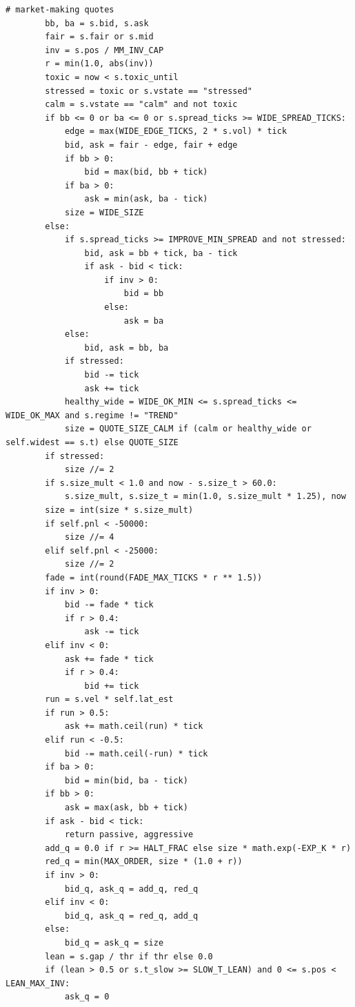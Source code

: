\begin{lstlisting}[style=algocode]
        # market-making quotes
        bb, ba = s.bid, s.ask
        fair = s.fair or s.mid
        inv = s.pos / MM_INV_CAP
        r = min(1.0, abs(inv))
        toxic = now < s.toxic_until
        stressed = toxic or s.vstate == "stressed"
        calm = s.vstate == "calm" and not toxic
        if bb <= 0 or ba <= 0 or s.spread_ticks >= WIDE_SPREAD_TICKS:
            edge = max(WIDE_EDGE_TICKS, 2 * s.vol) * tick
            bid, ask = fair - edge, fair + edge
            if bb > 0:
                bid = max(bid, bb + tick)
            if ba > 0:
                ask = min(ask, ba - tick)
            size = WIDE_SIZE
        else:
            if s.spread_ticks >= IMPROVE_MIN_SPREAD and not stressed:
                bid, ask = bb + tick, ba - tick
                if ask - bid < tick:
                    if inv > 0:
                        bid = bb
                    else:
                        ask = ba
            else:
                bid, ask = bb, ba
            if stressed:
                bid -= tick
                ask += tick
            healthy_wide = WIDE_OK_MIN <= s.spread_ticks <= WIDE_OK_MAX and s.regime != "TREND"
            size = QUOTE_SIZE_CALM if (calm or healthy_wide or self.widest == s.t) else QUOTE_SIZE
        if stressed:
            size //= 2
        if s.size_mult < 1.0 and now - s.size_t > 60.0:
            s.size_mult, s.size_t = min(1.0, s.size_mult * 1.25), now
        size = int(size * s.size_mult)
        if self.pnl < -50000:
            size //= 4
        elif self.pnl < -25000:
            size //= 2
        fade = int(round(FADE_MAX_TICKS * r ** 1.5))
        if inv > 0:
            bid -= fade * tick
            if r > 0.4:
                ask -= tick
        elif inv < 0:
            ask += fade * tick
            if r > 0.4:
                bid += tick
        run = s.vel * self.lat_est
        if run > 0.5:
            ask += math.ceil(run) * tick
        elif run < -0.5:
            bid -= math.ceil(-run) * tick
        if ba > 0:
            bid = min(bid, ba - tick)
        if bb > 0:
            ask = max(ask, bb + tick)
        if ask - bid < tick:
            return passive, aggressive
        add_q = 0.0 if r >= HALT_FRAC else size * math.exp(-EXP_K * r)
        red_q = min(MAX_ORDER, size * (1.0 + r))
        if inv > 0:
            bid_q, ask_q = add_q, red_q
        elif inv < 0:
            bid_q, ask_q = red_q, add_q
        else:
            bid_q = ask_q = size
        lean = s.gap / thr if thr else 0.0
        if (lean > 0.5 or s.t_slow >= SLOW_T_LEAN) and 0 <= s.pos < LEAN_MAX_INV:
            ask_q = 0

\end{lstlisting}
